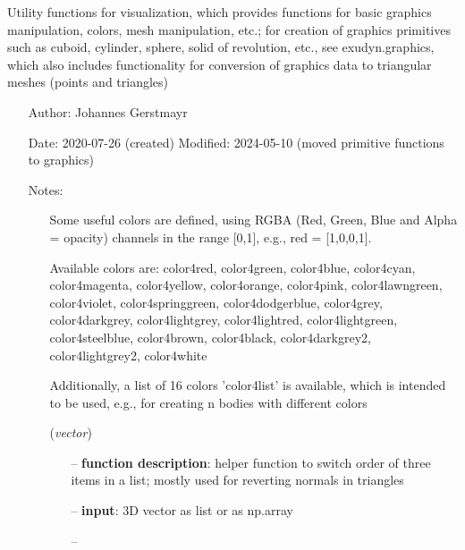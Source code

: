 \begin{itemize}[leftmargin=1.4cm]
\begin{itemize}[leftmargin=1.4cm]
\begin{itemize}[leftmargin=1.4cm]
\begin{itemize}[leftmargin=0.5cm]
\begin{itemize}[leftmargin=1.4cm]
\begin{itemize}[leftmargin=1.4cm]
\begin{itemize}[leftmargin=0.5cm]
\begin{itemize}[leftmargin=1.4cm]
%
\label{sec:module:graphicsDataUtilities}
  Utility functions for visualization, which provides functions for basic graphics manipulation, colors, mesh manipulation, etc.;
           for creation of graphics primitives such as cuboid, cylinder, sphere, solid of revolution, etc., see exudyn.graphics,
           which also includes functionality for conversion of graphics data to triangular meshes (points and triangles)
\begin{itemize}[leftmargin=1.4cm]
\setlength{\itemindent}{-1.4cm}
\item[]Author:    Johannes Gerstmayr
\item[]Date:      2020-07-26 (created)
 Modified: 2024-05-10 (moved primitive functions to graphics)
\item[]Notes:
\vspace{-22pt}\begin{itemize}[leftmargin=0.5cm]
\setlength{\itemindent}{-0.5cm}
\item[]    Some useful colors are defined, using RGBA (Red, Green, Blue and Alpha = opacity) channels            in the range [0,1], e.g., red = [1,0,0,1].
\item[]            Available colors are: color4red, color4green, color4blue, color4cyan, color4magenta, color4yellow, color4orange, color4pink, color4lawngreen, color4violet, color4springgreen, color4dodgerblue, color4grey, color4darkgrey, color4lightgrey, color4lightred, color4lightgreen, color4steelblue, color4brown, color4black, color4darkgrey2, color4lightgrey2, color4white
\item[]            Additionally, a list of 16 colors 'color4list' is available, which is intended to be used, e.g., for creating n bodies with different colors 
\ei
\ei
\begin{flushleft}
\label{sec:graphicsDataUtilities:SwitchTripletOrder}
({\it vector})
\end{flushleft}
\setlength{\itemindent}{0.7cm}
\begin{itemize}[leftmargin=0.7cm]
\item[--]
{\bf function description}: helper function to switch order of three items in a list; mostly used for reverting normals in triangles
\item[--]
{\bf input}: 3D vector as list or as np.array
\item[--]

\end{itemize}
\end{itemize}
\end{itemize}
\end{itemize}
\end{itemize}
\end{itemize}
\end{itemize}
\end{itemize}
\end{itemize}
\end{itemize}
\end{itemize}
